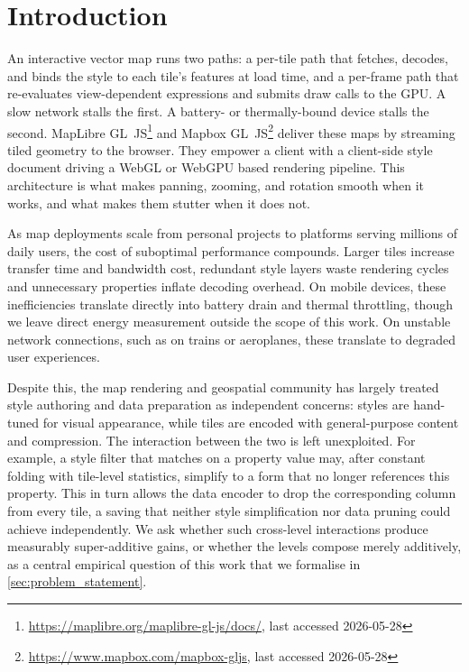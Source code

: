 \chapter{Introduction}\label{ch:introduction}

An interactive vector map runs two paths: a per-tile path that fetches, decodes, and binds the style to each tile's features at load time, and a per-frame path that re-evaluates view-dependent expressions and submits draw calls to the \ac{GPU}.
A slow network stalls the first.
A battery- or thermally-bound device stalls the second.
MapLibre GL~JS\footnote{\url{https://maplibre.org/maplibre-gl-js/docs/}, last accessed 2026-05-28} and Mapbox GL~JS\footnote{\url{https://www.mapbox.com/mapbox-gljs}, last accessed 2026-05-28} deliver these maps by streaming tiled geometry to the browser.
They empower a client with a client-side style document driving a \ac{WebGL} or \ac{WebGPU} based rendering pipeline.
This architecture is what makes panning, zooming, and rotation smooth when it works, and what makes them stutter when it does not.

As map deployments scale from personal projects to platforms serving millions of daily users, the cost of suboptimal performance compounds.
Larger tiles increase transfer time and bandwidth cost, redundant style layers waste rendering cycles and unnecessary properties inflate decoding overhead.
On mobile devices, these inefficiencies translate directly into battery drain and thermal throttling, though we leave direct energy measurement outside the scope of this work.
On unstable network connections, such as on trains or aeroplanes, these translate to degraded user experiences.

Despite this, the map rendering and geospatial community has largely treated style authoring and data preparation as independent concerns: styles are hand-tuned for visual appearance, while tiles are encoded with general-purpose content and compression.
The interaction between the two is left unexploited.
For example, a style filter that matches on a property value may, after constant folding with tile-level statistics, simplify to a form that no longer references this property.
This in turn allows the data encoder to drop the corresponding column from every tile, a saving that neither style simplification nor data pruning could achieve independently.
We ask whether such cross-level interactions produce measurably super-additive gains, or whether the levels compose merely additively, as a central empirical question of this work that we formalise in \cref{sec:problem_statement}.

